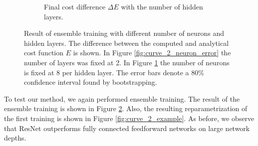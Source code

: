 \begin{figure}[b]
\begin{subfigure}[t]{0.5\textwidth}
        \caption{Final cost  difference \(\Delta E\) with the number of hidden layers.} \label{fig:curve_2_layer_error}
    \end{subfigure}
    \caption{Result of ensemble training with different number of neurons and hidden layers. The difference between the computed and analytical cost function \(E\) is shown. In Figure \ref{fig:curve_2_neuron_error} the number of layers was fixed at 2. In Figure \ref{fig:curve_2_layer_error} the number of neurons is fixed at 8 per hidden layer. The error bars denote a 80\% confidence interval found by bootstrapping.} \label{fig:curve_2_parmas_eks}
\end{figure}

To test our method, we again performed ensemble training. The result of the ensemble training is shown in Figure \ref{fig:curve_2_parmas_eks}. Also, the resulting reparametrization of the first training is shown in Figure \ref{fig:curve_2_example}. As before, we observe that ResNet outperforms fully connected feedforward networks on large network depths. 
